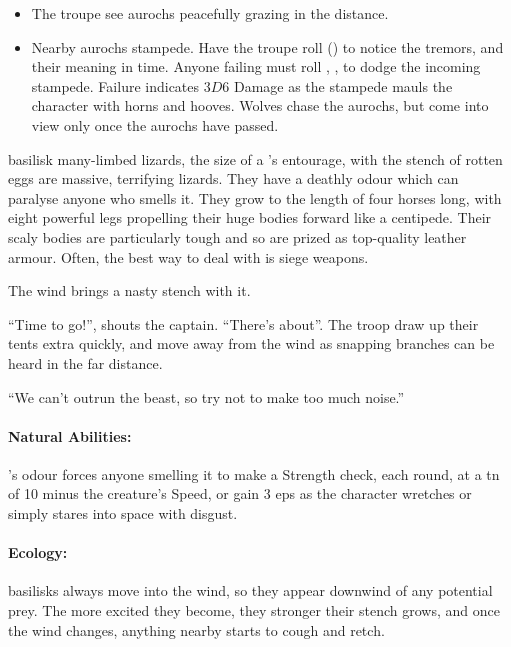 \begin{multicols}{2}
\showEnc

\begin{itemize}
  \item
  The troupe see aurochs peacefully grazing in the distance.
  \item
  Nearby aurochs stampede.
  Have the troupe roll  (\tn[8]) to notice the tremors, and their meaning in time.
  Anyone failing must roll , \tn[9], to dodge the incoming stampede.
  Failure indicates $3D6$ Damage as the stampede mauls the character with horns and hooves.
  Wolves chase the aurochs, but come into view only once the aurochs have passed.

\end{itemize}

  {basilisk}%
  {many-limbed lizards, the size of a 's entourage, with the stench of rotten eggs}%
are massive, terrifying lizards.
They have a deathly odour which can paralyse anyone who smells it.
They grow to the length of four horses long, with eight powerful legs propelling their huge bodies forward like a centipede.
Their scaly bodies are particularly tough and so are prized as top-quality leather armour.
Often, the best way to deal with  is siege weapons.

\begin{boxtext}
  The wind brings a nasty stench with it.

  ``Time to go!'', shouts the captain.
  ``There's  about''.
  The troop draw up their tents extra quickly, and move away from the wind as snapping branches can be heard in the far distance.

  ``We can't outrun the beast, so try not to make too much noise.''
\end{boxtext}

\basilisk

\paragraph{Natural Abilities:} 's odour forces anyone smelling it to make a Strength check, each round, at a \gls{tn} of 10 minus the creature's Speed, or gain 3 \glspl{ep} as the character wretches or simply stares into space with disgust.

\paragraph{Ecology:}
\Glspl{basilisk} always move into the wind, so they appear downwind of any potential prey.
The more excited they become, they stronger their stench grows, and once the wind changes, anything nearby starts to cough and retch.


\end{multicols}
